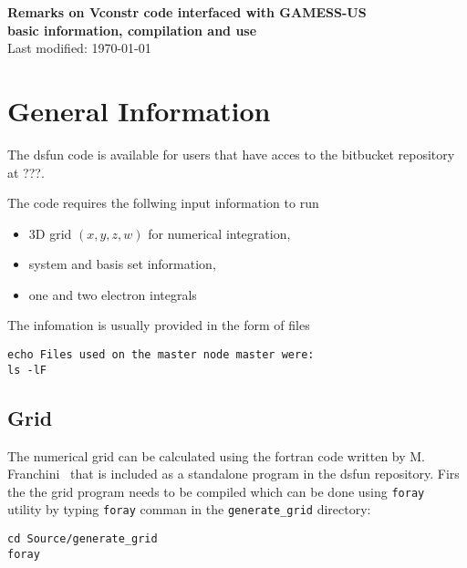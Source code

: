\documentclass[10pt]{article}
\begin{document}
\thispagestyle{first}
\footnotesize

\begin{center}
    \Large{\textbf{Remarks on Vconstr code interfaced with GAMESS-US}} \\ 
    \normalsize{\textbf{basic information, compilation and use}} \\
    \normalsize{Last modified: \today}
\end{center}

\section{General Information}

The dsfun code is available for users that have acces to the bitbucket repository at ???.

The code requires the follwing input information to run
\begin{itemize}
    \item 3D grid $(x,y,z,w)$ for numerical integration,
    \item system and basis set information,
    \item one and two electron integrals
\end{itemize}
The infomation is usually provided in the form of files
\begin{verbatim}
echo Files used on the master node master were:
ls -lF 
\end{verbatim}

\subsection{Grid}

The numerical grid can be calculated using the fortran code written by M.
Franchini~\cite{Franchini2013} that is included as a standalone program in the
dsfun repository. Firs the the grid program needs to be compiled which can be done
using \verb!foray!~\cite{foray} utility by typing \verb!foray! comman in the \verb!generate_grid!
directory:
\begin{verbatim}
cd Source/generate_grid
foray
\end{verbatim}
\end{document}

